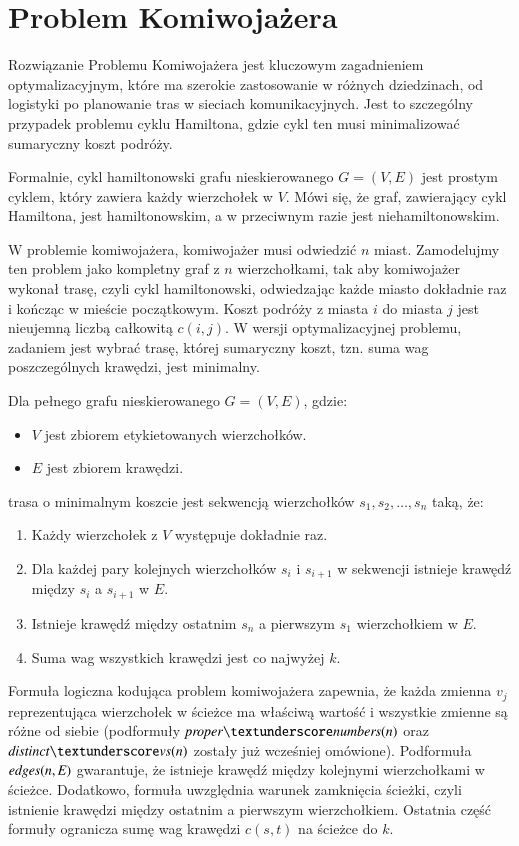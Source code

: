 

\section{Problem Komiwojażera}
Rozwiązanie Problemu Komiwojażera jest kluczowym zagadnieniem optymalizacyjnym, które ma szerokie zastosowanie w różnych dziedzinach, od logistyki po planowanie tras w sieciach komunikacyjnych. Jest to szczególny przypadek problemu cyklu Hamiltona, gdzie cykl ten musi minimalizować sumaryczny koszt podróży. 

Formalnie, cykl hamiltonowski grafu nieskierowanego $G = (V, E)$ jest prostym cyklem, który zawiera każdy wierzchołek w \(V\). Mówi się, że graf, zawierający cykl Hamiltona, jest hamiltonowskim, a w przeciwnym razie jest niehamiltonowskim. 

W problemie komiwojażera, komiwojażer musi odwiedzić \(n\) miast. Zamodelujmy ten problem jako kompletny graf z \(n\) wierzchołkami, tak aby komiwojażer wykonał trasę, czyli cykl hamiltonowski, odwiedzając każde miasto dokładnie raz i kończąc w mieście początkowym. Koszt podróży z miasta \(i\) do miasta \(j\) jest nieujemną liczbą całkowitą \(c(i, j)\). W wersji optymalizacyjnej problemu, zadaniem jest wybrać trasę, której sumaryczny koszt, tzn. suma wag poszczególnych krawędzi, jest minimalny.

Dla pełnego grafu nieskierowanego $G = (V, E)$, gdzie:
\begin{itemize}
	\item \(V\) jest zbiorem etykietowanych wierzchołków.
	\item \(E\) jest zbiorem krawędzi.
\end{itemize}
trasa o minimalnym koszcie jest sekwencją wierzchołków $s_1, s_2, …, s_n$ taką, że:
\begin{enumerate}
	\item Każdy wierzchołek z \(V\) występuje dokładnie raz.
	\item Dla każdej pary kolejnych wierzchołków \(s_i\) i \(s_{i+1}\) w sekwencji istnieje krawędź między \(s_i\) a \(s_{i+1}\) w \(E\).
	\item Istnieje krawędź między ostatnim \(s_n\) a pierwszym \(s_1\) wierzchołkiem w \(E\).
	\item Suma wag wszystkich krawędzi jest co najwyżej \(k\).
\end{enumerate}

Formuła logiczna kodująca problem komiwojażera zapewnia, że każda zmienna \(v_j\) reprezentująca wierzchołek w ścieżce ma właściwą wartość i wszystkie zmienne są różne od siebie (podformuły $\propernumbers$ oraz $\distinctvs$ zostały już wcześniej omówione). Podformuła ${\mathit{edges(n, E)}}$ gwarantuje, że istnieje krawędź między kolejnymi wierzchołkami w ścieżce. Dodatkowo, formuła uwzględnia warunek zamknięcia ścieżki, czyli istnienie krawędzi między ostatnim a pierwszym wierzchołkiem. Ostatnia część formuły ogranicza sumę wag krawędzi $c(s, t)$ na ścieżce do \(k\).

